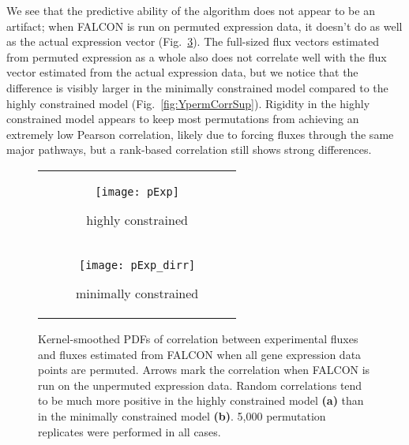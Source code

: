 We see that the predictive ability of the algorithm does not
appear to be an artifact; when FALCON is run on permuted expression data,
it doesn't do as well as the actual expression vector (Fig.~\ref{fig:YpermCorr}).
The full-sized flux vectors estimated from permuted expression as a
whole also does not correlate well with the flux vector estimated from
the actual expression data, but we notice that the difference is
visibly larger in the minimally constrained model compared to the
highly constrained model (\suppOrApp Fig.~\ref{fig:YpermCorrSup}). Rigidity in the
highly constrained model appears to keep most permutations from
achieving an extremely low Pearson correlation, likely due to forcing
fluxes through the same major pathways, but a rank-based correlation
still shows strong differences.
 
\begin{figure}
\centering
\begin{tabular}{c}
  \begin{subfigure}[b]{0.5\textwidth}
  \texttt{[image: pExp]}
  \caption{highly constrained} \label{fig:YpermCorr:A}
  \end{subfigure}
\\
  \begin{subfigure}[b]{0.5\textwidth}
  \texttt{[image: pExp\_dirr]}
  \caption{minimally constrained} \label{fig:YpermCorr:B}
  \end{subfigure} 
\\
\end{tabular}
\vspace{-4mm} 
\caption{Kernel-smoothed PDFs of correlation between experimental
fluxes and fluxes estimated from FALCON when all gene expression data
points are permuted. Arrows mark the correlation when FALCON is run on
the unpermuted expression data.  Random correlations tend to be much
more positive in the highly constrained model \textbf{(a)} than in the
minimally constrained model \textbf{(b)}. 5,000 permutation replicates
were performed in all cases.}
\label{fig:YpermCorr}
\end{figure}



